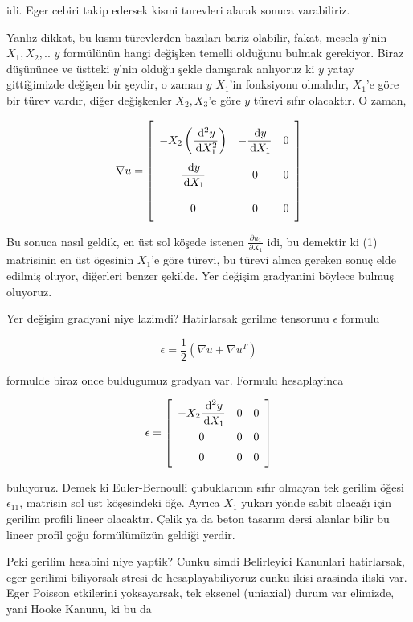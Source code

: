 \documentclass[12pt,fleqn]{article}\usepackage{../../common}
\begin{document}
idi. Eger cebiri takip edersek kismi turevleri alarak sonuca varabiliriz.

Yanlız dikkat, bu kısmı türevlerden bazıları bariz olabilir, fakat, mesela
$y$'nin $X_1,X_2,..$ $y$ formülünün hangi değişken temelli olduğunu bulmak
gerekiyor. Biraz düşününce ve üstteki $y$'nin olduğu şekle danışarak anlıyoruz
ki $y$ yatay gittiğimizde değişen bir şeydir, o zaman $y$ $X_1$'in fonksiyonu
olmalıdır, $X_1$'e göre bir türev vardır, diğer değişkenler $X_2,X_3$'e göre $y$
türevi sıfır olacaktır. O zaman,

$$
\renewcommand*{\arraystretch}{2.5}
\nabla u = \left[\begin{array}{ccc}
-X_2 \left( \dfrac{\ud^2 y}{\ud X_1^2} \right)  & - \dfrac{\ud y}{\ud X_1} & 0 \\ 
\dfrac{\ud y}{\ud X_1} & 0 & 0 \\ 
0 & 0 & 0
\end{array}\right]
$$

Bu sonuca nasıl geldik, en üst sol köşede istenen $\frac{\partial u_1}{\partial X_1}$
idi, bu demektir ki (1) matrisinin en üst ögesinin $X_1$'e göre türevi, bu
türevi alınca gereken sonuç elde edilmiş oluyor, diğerleri benzer şekilde.
Yer değişim gradyanini böylece bulmuş oluyoruz.

Yer değişim gradyani niye lazimdi? Hatirlarsak gerilme tensorunu $\epsilon$ formulu

$$
\epsilon = \frac{1}{2} (\nabla u + \nabla u^T )
$$

formulde biraz once buldugumuz gradyan var. Formulu hesaplayinca 

$$
\renewcommand*{\arraystretch}{1.5}
\epsilon = \left[\begin{array}{ccc}
-X_2 \dfrac{\ud^2 y}{\ud X_1} & 0 & 0 \\
0 & 0 & 0 \\
0 & 0 & 0 
\end{array}\right]
$$

buluyoruz. Demek ki Euler-Bernoulli çubuklarının sıfır olmayan tek gerilim
öğesi $\epsilon_{11}$, matrisin sol üst köşesindeki öğe. Ayrıca $X_1$
yukarı yönde sabit olacağı için gerilim profili lineer olacaktır. Çelik
ya da beton tasarım dersi alanlar bilir bu lineer profil çoğu formülümüzün
geldiği yerdir. 

Peki gerilim hesabini niye yaptik? Cunku simdi Belirleyici Kanunlari
hatirlarsak, eger gerilimi biliyorsak stresi de hesaplayabiliyoruz cunku ikisi
arasinda iliski var. Eger Poisson etkilerini yoksayarsak, tek eksenel (uniaxial)
durum var elimizde, yani Hooke Kanunu, ki bu da
\end{document}
